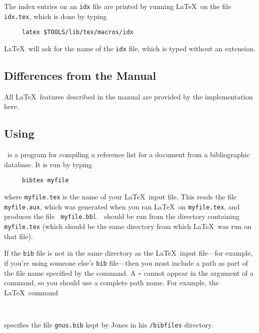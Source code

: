 The index entries on an {\tt idx} file are printed by running \LaTeX\
on the file \mbox{\tt idx.tex}, which is done by typing
\begin{verbatim}
     latex $TOOLS/lib/tex/macros/idx
\end{verbatim}
\LaTeX\ will ask for the name of the {\tt idx} file, which is typed
without an extension.



\subsection{Differences from the Manual}

All \LaTeX\ features described in the manual are provided by
the implementation here.





\subsection{Using \BibTeX}

\BibTeX\
is a program for compiling a reference list for a document from a
bibliographic database.  It is run by typing
\begin{verbatim}
     bibtex myfile
\end{verbatim}
where \mbox{\tt myfile.tex} is the name of your \LaTeX\ input file.
This reads the file \mbox{\tt myfile.aux}, which was generated when you
ran \LaTeX\ on \mbox{\tt myfile.tex}, and produces the file \mbox{\tt
myfile.bbl}.  \BibTeX\ should be run from the directory containing
\mbox{\tt myfile.tex} (which should be the same directory from which
\LaTeX\ was run on that file).

If the {\tt bib} file is not in the same directory as the \LaTeX\ input
file---for example, if you're using someone else's {\tt bib}
file---then you must include a path as part of the file name specified
by the \hbox{\verb||} command.  A \verb|~| cannot appear
in the argument of a \hbox{\verb||} command, so you should
use a complete path name.  For example, the \LaTeX\ command
\begin{verbatim}
     
\end{verbatim}
specifies the file \mbox{\tt gnus.bib} kept by Jones in his
\mbox{\tt /bibfiles} directory.


